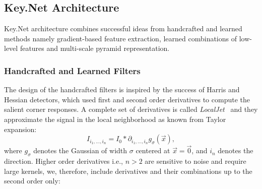 \subsection{Key.Net Architecture}
\label{sec:architecture}
Key.Net architecture combines successful ideas from handcrafted and learned methods namely gradient-based feature extraction, learned combinations of low-level features and multi-scale pyramid representation. %


\subsubsection{Handcrafted and Learned Filters}
\label{sec:handcrafted_filters}
The design of the handcrafted filters is inspired by the success of Harris \cite{Harris} and Hessian \cite{Hessian} detectors, which used first and second order derivatives to compute the salient corner responses. A complete set of derivatives is called {\em LocalJet}~\cite{Koendering-FlorackLocalJet} and they approximate the signal in the local neighborhood as known from Taylor expansion:
\begin{equation}
I_{i_1,\ldots,i_n}=I_0\ast\partial_{i_1,\ldots,i_n}g_{\sigma}(\vec{x}),
\label{eq:Taylor}
\end{equation}
where $g_{\sigma}$ denotes the Gaussian of width $\sigma$ centered at $\vec{x}=\vec{0}$, and $i_n$ denotes the direction. Higher order derivatives i.e., $n>2$ are sensitive to noise and require large kernels, we, therefore, include derivatives and their combinations up to the second order only: 

